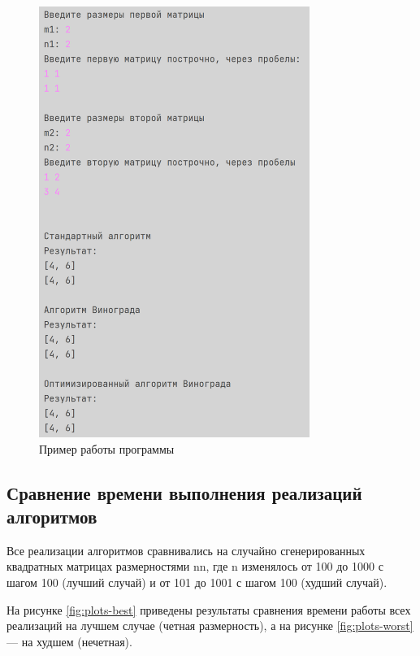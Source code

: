 \begin{figure}[h!btp]
	\centering
	\includegraphics[width=250pt]{inc/output.png}
	\caption{Пример работы программы}
	\label{fig:output}	
\end{figure}

\subsection{Сравнение времени выполнения реализаций алгоритмов}

 Все реализации алгоритмов сравнивались на случайно сгенерированных квадратных матрицах размерностями n\cdot n, где n изменялось от 100 до 1000 с шагом 100 (лучший случай) и от 101 до 1001 с шагом 100 (худший случай).
 
На рисунке \ref{fig:plots-best} приведены результаты сравнения времени работы всех реализаций на лучшем случае (четная размерность), а на рисунке \ref{fig:plots-worst} --- на худшем (нечетная). 

\clearpage

